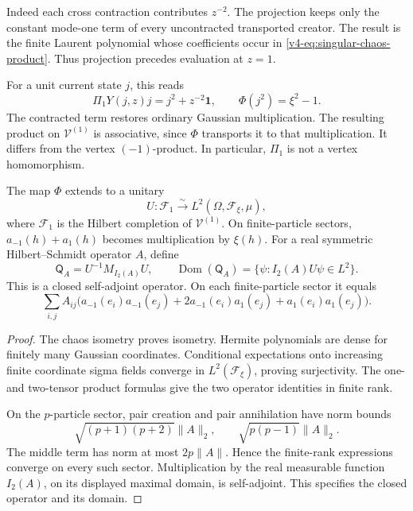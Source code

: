 Indeed each cross contraction contributes \(z^{-2}\).
The projection keeps only the constant mode-one
term of every uncontracted transported creator.
The result is the finite Laurent polynomial whose
coefficients occur in \eqref{v4-eq:singular-chaos-product}.
Thus projection precedes evaluation at \(z=1\).

For a unit current state \(j\), this reads
\[
 \Pi_1Y(j,z)j=j^2+z^{-2}\mathbf1,\qquad
 \Phi(j^2)=\xi^2-1.
\]
The contracted term restores ordinary Gaussian
multiplication. The resulting product on
\(\mathcal V^{(1)}\) is associative, since \(\Phi\)
transports it to that multiplication.
It differs from the vertex \((-1)\)-product.
In particular, \(\Pi_1\) is not a vertex homomorphism.

\begin{proposition}\label{v4-prop:singular-gaussian-unitary}
The map \(\Phi\) extends to a unitary
\[
 U:\mathcal F_1\xrightarrow{\sim}
       L^2(\Omega,\mathcal F_\xi,\mu),
\]
where \(\mathcal F_1\) is the Hilbert completion of
\(\mathcal V^{(1)}\). On finite-particle sectors,
\(a_{-1}(h)+a_1(h)\) becomes multiplication by \(\xi(h)\).
For a real symmetric Hilbert--Schmidt operator \(A\),
define
\[
 \mathsf Q_A=U^{-1}M_{I_2(A)}U,\qquad
 \operatorname{Dom}(\mathsf Q_A)
     =\{\psi:I_2(A)U\psi\in L^2\}.
\]
This is a closed self-adjoint operator. On each
finite-particle sector it equals
\begin{equation}\label{v4-eq:singular-gaussian-quadratic-operator}
 \sum_{i,j}A_{ij}\bigl(
      a_{-1}(e_i)a_{-1}(e_j)
      +2a_{-1}(e_i)a_1(e_j)+a_1(e_i)a_1(e_j)\bigr).
\end{equation}
\end{proposition}

\begin{proof}
The chaos isometry proves isometry. Hermite
polynomials are dense for finitely many Gaussian
coordinates. Conditional expectations onto
increasing finite coordinate sigma fields converge
in \(L^2(\mathcal F_\xi)\), proving surjectivity.
The one- and two-tensor product formulas give
the two operator identities in finite rank.

On the \(p\)-particle sector, pair creation and
pair annihilation have norm bounds
\[
 \sqrt{(p+1)(p+2)}\|A\|_2,\qquad
 \sqrt{p(p-1)}\|A\|_2.
\]
The middle term has norm at most \(2p\|A\|\).
Hence the finite-rank expressions converge
on every such sector. Multiplication by the
real measurable function \(I_2(A)\), on its
displayed maximal domain, is self-adjoint.
This specifies the closed operator and its domain.
\end{proof}

